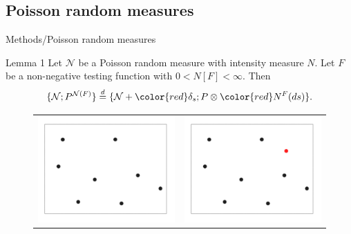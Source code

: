 \documentclass[xcolor=dvipsnames]{beamer}
\begin{document}
\subsection{Poisson random measures}
\begin{frame}{Methods/Poisson random measures}
  \begin{block}{Lemma 1}
    Let $\mathcal N$ be a Poisson random measure with intensity measure $N$. 
    Let $F$ be a non-negative testing function with $0 < N[F] < \infty$.
    Then    
    \[
      \{\mathcal N; P^{\mathcal N(F)}\}
      \overset{d}{=} \{\mathcal N + {\color{red} \delta_s}; P \otimes {\color{red}N^F(ds)}\}.
    \]
  \end{block}
  \begin{figure}[h]
    \begin{tabular}{ll}
      \includegraphics[scale=0.08]{001.jpg}
      &
        \includegraphics[scale=0.08]{002.jpg}
    \end{tabular}
  \end{figure}
\end{frame}
\end{document}
